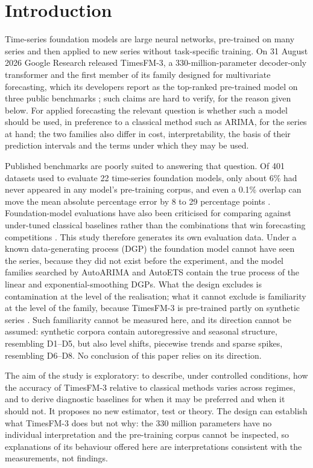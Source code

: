 \documentclass[ASNA]{USG}
\begin{document}
\section{Introduction}
\label{sec:intro}

Time-series foundation models are large neural networks, pre-trained on many series and then applied
to new series without task-specific training. On 31 August 2026 Google Research released TimesFM-3, a
330-million-parameter decoder-only transformer and the first member of its family designed for
multivariate forecasting, which its developers report as the top-ranked pre-trained model on three
public benchmarks \citep{timesfm3blog}; such claims are hard to verify, for the reason given below. For
applied forecasting the relevant question is whether such a model should be used, in preference to a
classical method such as ARIMA, for the series at hand; the two families also differ in cost,
interpretability, the basis of their prediction intervals and the terms under which they may be used.

Published benchmarks are poorly suited to answering that question. Of 401 datasets used to evaluate
22 time-series foundation models, only about 6\% had never appeared in any model's pre-training
corpus, and even a 0.1\% overlap can move the mean absolute percentage error by 8 to 29 percentage
points \citep{meyer2025leakage}. Foundation-model evaluations have also been criticised for comparing
against under-tuned classical baselines rather than the combinations that win forecasting competitions
\citep{makridakis2020m4}. This study therefore generates its own evaluation data. Under a known
data-generating process (DGP) the foundation model cannot have seen the series, because they did not
exist before the experiment, and the model families searched by AutoARIMA and AutoETS contain the true
process of the linear and exponential-smoothing DGPs. What the design excludes is contamination at the
level of the realisation; what it cannot exclude is familiarity at the level of the family, because
TimesFM-3 is pre-trained partly on synthetic series \citep{timesfm3blog}. Such familiarity cannot be
measured here, and its direction cannot be assumed: synthetic corpora contain autoregressive and seasonal
structure, resembling D1--D5, but also level shifts, piecewise trends and sparse spikes, resembling
D6--D8. No conclusion of this paper relies on its direction.

The aim of the study is exploratory: to describe, under controlled conditions, how the accuracy of
TimesFM-3 relative to classical methods varies across regimes, and to derive diagnostic baselines for
when it may be preferred and when it should not. It proposes no new estimator, test or theory. The
design can establish what TimesFM-3 does but not why: the 330 million parameters have no individual
interpretation and the pre-training corpus cannot be inspected, so explanations of its behaviour offered
here are interpretations consistent with the measurements, not findings.
\end{document}
